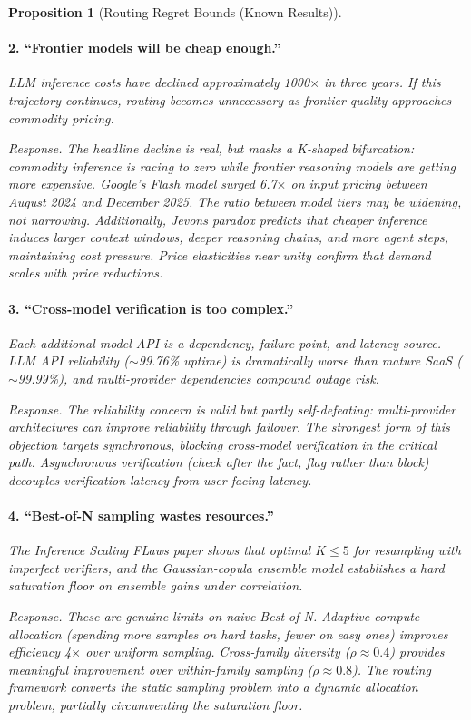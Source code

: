 \documentclass[11pt, a4paper, logo, copyright]{googledeepmind}
\newtheorem{proposition}{Proposition}[section]
\begin{document}
\begin{proposition}[Routing Regret Bounds (Known Results)]
\paragraph{2. ``Frontier models will be cheap enough.''} LLM inference costs have declined approximately 1000$\times$ in three years. If this trajectory continues, routing becomes unnecessary as frontier quality approaches commodity pricing.

\emph{Response.} The headline decline is real, but masks a K-shaped bifurcation: commodity inference is racing to zero while frontier reasoning models are getting \emph{more} expensive. Google's Flash model surged 6.7$\times$ on input pricing between August 2024 and December 2025. The ratio between model tiers may be widening, not narrowing. Additionally, Jevons paradox predicts that cheaper inference induces larger context windows, deeper reasoning chains, and more agent steps, maintaining cost pressure. Price elasticities near unity confirm that demand scales with price reductions.

\paragraph{3. ``Cross-model verification is too complex.''} Each additional model API is a dependency, failure point, and latency source. LLM API reliability ($\sim$99.76\% uptime) is dramatically worse than mature SaaS ($\sim$99.99\%), and multi-provider dependencies compound outage risk.

\emph{Response.} The reliability concern is valid but partly self-defeating: multi-provider architectures can improve reliability through failover. The strongest form of this objection targets synchronous, blocking cross-model verification in the critical path. Asynchronous verification (check after the fact, flag rather than block) decouples verification latency from user-facing latency.

\paragraph{4. ``Best-of-N sampling wastes resources.''} The Inference Scaling FLaws paper \citep{inferencescalingflaws2024} shows that optimal $K \leq 5$ for resampling with imperfect verifiers, and the Gaussian-copula ensemble model \citep{correlatedensemble2026} establishes a hard saturation floor on ensemble gains under correlation.

\emph{Response.} These are genuine limits on \emph{naive} Best-of-N. Adaptive compute allocation (spending more samples on hard tasks, fewer on easy ones) improves efficiency 4$\times$ over uniform sampling. Cross-family diversity ($\rho \approx 0.4$) provides meaningful improvement over within-family sampling ($\rho \approx 0.8$). The routing framework converts the static sampling problem into a dynamic allocation problem, partially circumventing the saturation floor.


\end{proposition}
\end{document}
